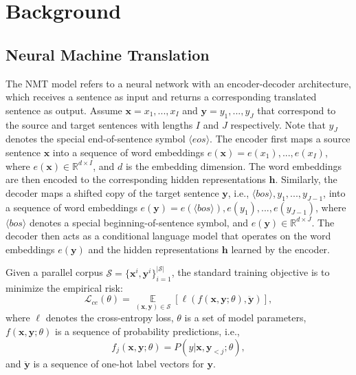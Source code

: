 \documentclass[11pt]{article}
\begin{document}
\section{Background}

\subsection{Neural Machine Translation}

The NMT model refers to a neural network with an encoder-decoder architecture, which receives a sentence as input and returns a corresponding translated sentence as output. Assume $\mathbf{x} = x_1, ..., x_I$ and $\mathbf{y} = y_1, ..., y_J$ that correspond to the source and target sentences with lengths $I$ and $J$ respectively. Note that $y_J$ denotes the special end-of-sentence symbol $\langle eos \rangle$. The encoder first maps a source sentence $\mathbf{x}$ into a sequence of word embeddings $e(\mathbf{x}) = e(x_1), ..., e(x_I)$, where $e(\mathbf{x}) \in \mathbb{R}^{d \times I}$, and $d$ is the embedding dimension. The word embeddings are then encoded to the corresponding hidden representations $\mathbf{h}$. Similarly, the decoder maps a shifted copy of the target sentence $\mathbf{y}$, i.e., $\langle bos \rangle, y_1, ..., y_{J-1}$, into a sequence of word embeddings $e(\mathbf{y}) = e(\langle bos \rangle), e(y_1), ..., e(y_{J-1})$, where $\langle bos \rangle$ denotes a special beginning-of-sentence symbol, and $e(\mathbf{y}) \in \mathbb{R}^{d \times J}$. The decoder then acts as a conditional language model that operates on the word embeddings $e(\mathbf{y})$ and the hidden representations $\mathbf{h}$ learned by the encoder.

Given a parallel corpus $\mathcal{S} = \{\mathbf{x}^i, \mathbf{y}^i\}_{i=1}^{|\mathcal{S}|}$, the standard training objective is to minimize the empirical risk:
\begin{equation}
\mathcal{L}_{ce}(\theta) =  \mathop{\mathbb{E}}\limits_{(\mathbf{x}, \mathbf{y}) \in \mathcal{S}} [\ell(f(\mathbf{x}, \mathbf{y}; \theta), \ddot{\mathbf{y}})],
\end{equation}
where $\ell$ denotes the cross-entropy loss, $\theta$ is a set of model parameters, $f(\mathbf{x}, \mathbf{y}; \theta)$ is a sequence of probability predictions, i.e., 
\begin{equation}
f_j(\mathbf{x}, \mathbf{y}; \theta) = P(y|\mathbf{x}, \mathbf{y}_{<j}; \theta),
\end{equation}
and $\ddot{\mathbf{y}}$ is a sequence of one-hot label vectors for $\mathbf{y}$. 
\end{document}
